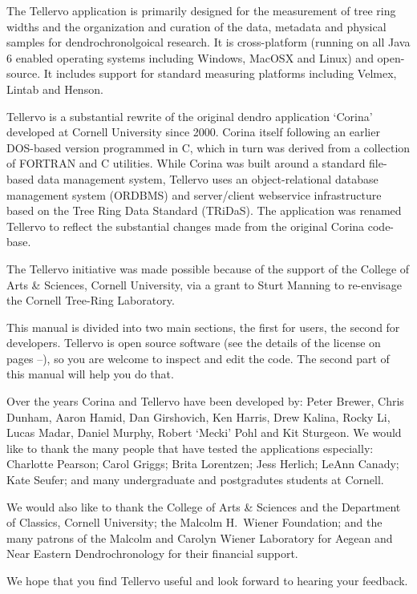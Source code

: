 The Tellervo application is primarily designed for the measurement of tree ring widths and the organization and curation of the data, metadata and physical samples for dendrochronolgoical research. It is cross-platform (running on all Java 6 enabled operating systems including Windows, MacOSX and Linux) and open-source. It includes support for standard measuring platforms including Velmex, Lintab and Henson.

Tellervo is a substantial rewrite of the original dendro application `Corina' developed at Cornell University since 2000.  Corina itself following an earlier DOS-based version programmed in C, which in turn was derived from a collection of FORTRAN and C utilities.  While Corina was built around a standard file-based data management system, Tellervo uses an object-relational database management system (ORDBMS) and server/client webservice infrastructure based on the Tree Ring Data Standard (TRiDaS).  The application was renamed Tellervo to reflect the substantial changes made from the original Corina code-base.

The Tellervo initiative was made possible because of the support of the College of Arts \& Sciences, Cornell University, via a grant to Sturt Manning to re-envisage the Cornell Tree-Ring Laboratory.

This manual is divided into two main sections, the first for users, the second for developers.  Tellervo is open source software (see the details of the license on pages \pageref{txt:licenseStart}--\pageref{txt:licenseEnd}), so you are welcome to inspect and edit the code.  The second part of this manual will help you do that.

Over the years Corina and Tellervo have been developed by: Peter Brewer, Chris Dunham, Aaron Hamid, Dan Girshovich, Ken Harris, Drew Kalina, Rocky Li, Lucas Madar, Daniel Murphy, Robert `Mecki' Pohl and Kit Sturgeon.  We would like to thank the many people that have tested the applications especially: Charlotte Pearson; Carol Griggs; Brita Lorentzen; Jess Herlich; LeAnn Canady; Kate Seufer; and many undergraduate and postgradutes students at Cornell.  

We would also like to thank the College of Arts \& Sciences and the Department of Classics, Cornell University; the Malcolm H.\ Wiener Foundation; and the many patrons of the Malcolm and Carolyn Wiener Laboratory for Aegean and Near Eastern Dendrochronology for their financial support.  

We hope that you find Tellervo useful and look forward to hearing your feedback.  



